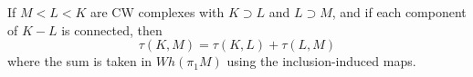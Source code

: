 If $M < L < K$ are CW complexes with $K \supset L$ and $L \supset M$, and if each component of $K-L$ is connected, then
$$\tau(K, M) = \tau(K, L) + \tau(L, M)$$
where the sum is taken in $Wh(\pi_1 M)$ using the inclusion-induced maps.
